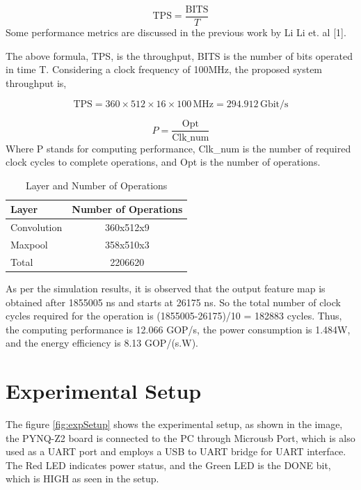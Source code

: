     \noindent

    \[
    \text{TPS} = \frac{\text{BITS}}{T}
    \]
    Some performance metrics are discussed in the previous work by Li Li et. al [1]. \par \noindent
    The above formula, TPS, is the throughput, BITS is the number of bits operated in time T. Considering a clock frequency of 100MHz, the proposed system throughput is,

    \[
    \text{TPS} = 360 \times 512 \times 16 \times 100\,\text{MHz} = 294.912\,\text{Gbit/s}
    \]

    \[
    P = \frac{\text{Opt}}{\text{Clk\_num}}
    \]
    Where P stands for computing performance, Clk\_num is the number of required clock cycles to complete operations, and Opt is the number of operations.
    
    \begin{table}[H]
    \centering
    \begin{tabular}{|l|c|}
        \hline
        \textbf{Layer} & \textbf{Number of Operations} \\
        \hline
        Convolution & 360x512x9 \\
        Maxpool     & 358x510x3 \\
        Total       & 2206620   \\
        \hline
    \end{tabular}
    \caption{Layer and Number of Operations}
    \label{tab:layer_operations}
    \end{table}

    \noindent
    As per the simulation results, it is observed that the output feature map is obtained after 1855005 ns and starts at 26175 ns. So the total number of clock cycles required for the operation is (1855005-26175)/10 = 182883 cycles. Thus, the computing performance is 12.066 GOP/s, the power consumption is 1.484W, and the energy efficiency is 8.13 GOP/(s.W).

    \section{Experimental Setup}
    \noindent
    The figure \ref{fig:expSetup} shows the experimental setup, as shown in the image, the PYNQ-Z2 board is connected to the PC through Microusb Port, which is also used as a  UART port and employs a USB to UART bridge for UART interface. The Red LED indicates power status, and the  Green LED is the DONE bit, which is HIGH as seen in the setup.
    

